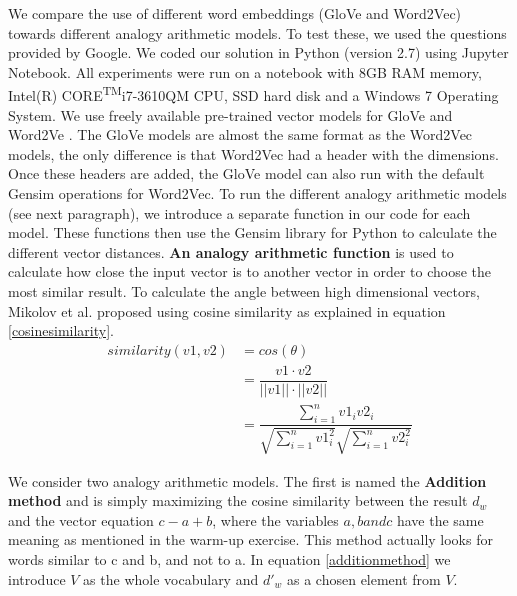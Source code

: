 We compare the use of different word embeddings (GloVe and Word2Vec) towards different analogy arithmetic models\cite{marekreiblog}. To test these, we used the questions provided by Google\cite{word2vecquestionwords}.
\newline
\newline
We coded our solution in Python (version 2.7) using Jupyter Notebook. All experiments were run on a notebook with 8GB RAM memory, Intel(R) CORE\textsuperscript{TM}i7-3610QM CPU, SSD hard disk and a Windows 7 Operating System.
\newline
\newline
We use freely available pre-trained vector models for GloVe \cite{glovedata} and Word2Ve \cite{word2vecdata}. The GloVe models are almost the same format as the Word2Vec models, the only difference is that Word2Vec had a header with the dimensions. Once these headers are added, the GloVe model can also run with the default Gensim operations for Word2Vec.
\newline
\newline
To run the different analogy arithmetic models (see next paragraph), we introduce a separate function in our code for each model. These functions then use the Gensim library for Python \cite{gensim} to calculate the different vector distances.
\newline
\newline
\textbf{An analogy arithmetic function} is used to calculate how close the input vector is to another vector in order to choose the most similar result. To calculate the angle between high dimensional vectors, Mikolov et al. \cite{mikolov} proposed using cosine similarity as explained in equation \ref{cosinesimilarity}. 
\begin{equation}
\begin{split}
\label{cosinesimilarity}
similarity(v1, v2) &= cos(\theta) \\&= \dfrac{v1 \cdot v2}{||v1|| \cdot ||v2||}  \\&= \dfrac{\sum_{i=1}^{n}v1_i v2_i}{\sqrt{\sum_{i=1}^{n}v1_i^2} \sqrt{\sum_{i=1}^{n} v2_i^2}}
\end{split}
\end{equation}

\leavevmode
\newline
We consider two analogy arithmetic models. The first is named the \textbf{Addition method} and is simply maximizing the cosine similarity between the result $d_w$ and the vector equation $c-a+b$, where the variables $a, b and c$ have the same meaning as mentioned in the warm-up exercise. This method actually looks for words similar to c and b, and not to a. In equation \ref{additionmethod} we introduce $V$ as the whole vocabulary and $d'_w$ as a chosen element from $V$.

